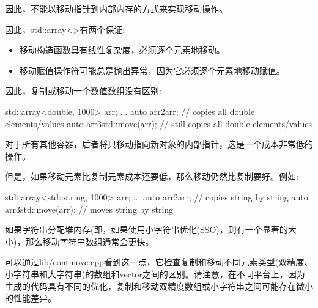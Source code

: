 因此，不能以移动指针到内部内存的方式来实现移动操作。

因此，std::array<>有两个保证:

\begin{itemize}
	\item 移动构造函数具有线性复杂度，必须逐个元素地移动。
	\item 移动赋值操作符可能总是抛出异常，因为它必须逐个元素地移动赋值。
\end{itemize}

因此，复制或移动一个数值数组没有区别:

\begin{cppcode}
std::array<double, 1000> arr;
...
auto arr2{arr}; // copies all double elements/values
auto arr3{std::move(arr)}; // still copies all double elements/values
\end{cppcode}

对于所有其他容器，后者将只移动指向新对象的内部指针，这是一个成本非常低的操作。

但是，如果移动元素比复制元素成本还要低，那么移动仍然比复制要好。例如:

\begin{cppcode}
std::array<std::string, 1000> arr;
...
auto arr2{arr}; // copies string by string
auto arr3{std::move(arr)}; // moves string by string
\end{cppcode}

如果字符串分配堆内存(即，如果使用小字符串优化(SSO)，则有一个显著的大小)，那么移动字符串数组通常会更快。

可以通过lib/contmove.cpp看到这一点，它检查复制和移动不同元素类型(双精度、小字符串和大字符串)的数组和vector之间的区别。请注意，在不同平台上，因为生成的代码具有不同的优化，复制和移动双精度数组或小字符串之间可能存在微小的性能差异。





















